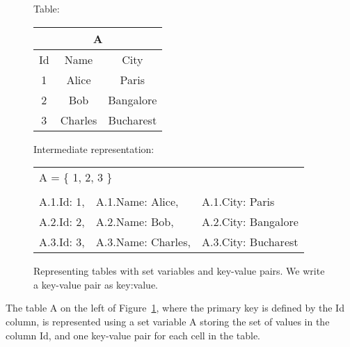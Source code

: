 \begin{figure}[t]
\centering
{\footnotesize
\begin{minipage}[t]{3cm}
\setlength{\tabcolsep}{3pt}
\begin{center}
Table:
\end{center}

\begin{tabular}{|c|c|c|} \hline
\multicolumn{3}{|c|}{A} \\ \hline\hline
Id & Name & City \\ \hline
1 & Alice & Paris \\ \hline
2 & Bob & Bangalore \\ \hline
3 & Charles & Bucharest \\ \hline
\end{tabular}
\end{minipage}\hspace{1cm}
\begin{minipage}[t]{5cm}
\begin{center}
Intermediate representation:
\end{center}
\setlength{\tabcolsep}{1pt}
\begin{tabular}{lll} 
\multicolumn{3}{l}{A = \{ 1, 2, 3 \}} \\
\\[1mm]
A.1.Id: 1, & A.1.Name: Alice, & A.1.City: Paris \\
A.2.Id: 2, & A.2.Name: Bob, & A.2.City: Bangalore \\
A.3.Id: 3, & A.3.Name: Charles, & A.3.City: Bucharest
\end{tabular}
\end{minipage}}
 \vspace{-2mm}
\caption{Representing tables with set variables and key-value pairs. We write a key-value pair as key:value.}
\label{fig:sql-example}
 \vspace{-2mm}
\end{figure}

\begin{example}

The table A on the left of Figure~\ref{fig:sql-example}, where the primary key is defined by the Id column, is represented using a set variable A storing the set of values in the column Id, and one key-value pair for each cell in the table.

\end{example}

